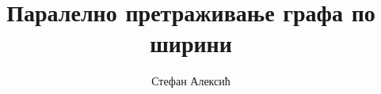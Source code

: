 \documentclass[12pt]{report}
\title{Паралелно претраживање графа по ширини}
\author{Стефан Алексић}
\begin{document}
\begin{sloppypar}


             









\typeout{}


\appendix
%
\cite{ashtsp}

\end{sloppypar}
\end{document}
